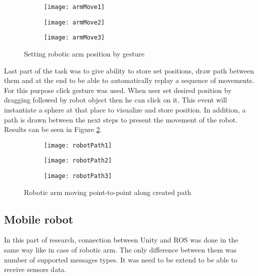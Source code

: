 \documentclass[printmode,en]{mgr}
\begin{document}
\begin{figure}[!ht]
\centering
\begin{subfigure}{.33\textwidth}
  \centering
  \texttt{[image: armMove1]}
\end{subfigure}%
\begin{subfigure}{.33\textwidth}
  \centering
  \texttt{[image: armMove2]}
\end{subfigure}
\begin{subfigure}{.33\textwidth}
  \centering
  \texttt{[image: armMove3]}
\end{subfigure}%
\caption{Setting robotic arm position by gesture}
\label{fig:armMove}
\end{figure}

Last part of the task was to give ability to store set positions, draw path between them and at the end to be able to automatically replay a sequence of movements. For this purpose click gesture was used. When user set desired position by dragging followed by robot object then he can click on it. This event will instantiate a sphere at that place to visualize and store position. In addition, a path is drawn between the next steps to present the movement of the robot. Results can be seen in Figure
\ref{fig:robotPath}.

\begin{figure}[!ht]
\centering
\begin{subfigure}{.33\textwidth}
  \centering
  \texttt{[image: robotPath1]}
\end{subfigure}%
\begin{subfigure}{.33\textwidth}
  \centering
  \texttt{[image: robotPath2]}
\end{subfigure}
\begin{subfigure}{.33\textwidth}
  \centering
  \texttt{[image: robotPath3]}
\end{subfigure}%
\caption{Robotic arm moving point-to-point along created path}
\label{fig:robotPath}
\end{figure}

\subsection{Mobile robot}
In this part of research, connection between Unity and ROS was done in the same way like in case of robotic arm. The only difference between them was number of supported messages types. It was need to be extend to be able to receive sensors data.
\end{document}
